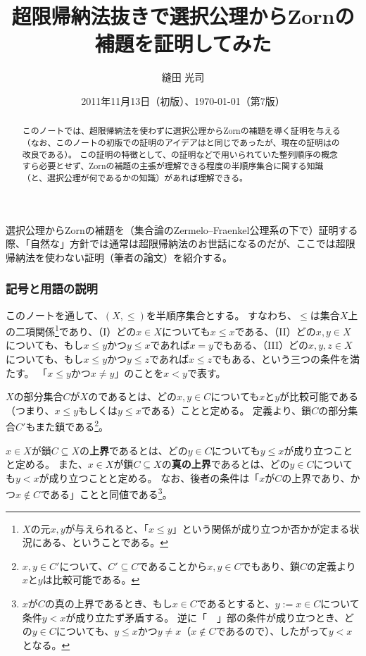﻿\documentclass{ltjsarticle}
\title{超限帰納法抜きで選択公理からZornの補題を証明してみた}
\author{縫田 光司}
\date{2011年11月13日（初版）、\today （第7版）}
\theoremstyle{definition}
\begin{document}
\maketitle
\vspace*{-2em}

\begin{abstract}
    このノートでは、超限帰納法を使わずに選択公理からZornの補題を導く証明を与える（なお、このノートの初版での証明のアイデアは\cite[Theorem 4.19]{RubRub85}と同じであったが、現在の証明は\cite{Lewin91}の改良である）。
    この証明の特徴として、\cite{Lewin91}の証明などで用いられていた整列順序の概念すら必要とせず、Zornの補題の主張が理解できる程度の半順序集合に関する知識（と、選択公理が何であるかの知識）があれば理解できる。
\end{abstract}

選択公理からZornの補題を（集合論のZermelo--Fraenkel公理系の下で）証明する際、「自然な」方針では通常は超限帰納法のお世話になるのだが、ここでは超限帰納法を使わない証明（筆者の論文\cite{Nuida24}）を紹介する。

\subsubsection*{記号と用語の説明}

このノートを通して、$(X,\leq)$を半順序集合とする。
すなわち、$\leq$は集合$X$上の二項関係\footnote{$X$の元$x,y$が与えられると、「$x \leq y$」という関係が成り立つか否かが定まる状況にある、ということである。}であり、（I）どの$x \in X$についても$x \leq x$である、（II）どの$x,y \in X$についても、もし$x \leq y$かつ$y \leq x$であれば$x = y$でもある、（III）どの$x,y,z \in X$についても、もし$x \leq y$かつ$y \leq z$であれば$x \leq z$でもある、という三つの条件を満たす。
「$x \leq y$かつ$x \neq y$」のことを$x < y$で表す。

$X$の部分集合$C$が$X$のであるとは、どの$x,y \in C$についても$x$と$y$が比較可能である（つまり、$x \leq y$もしくは$y \leq x$である）ことと定める。
定義より、鎖$C$の部分集合$C'$もまた鎖である\footnote{$x,y \in C'$について、$C' \subseteq C$であることから$x,y \in C$でもあり、鎖$C$の定義より$x$と$y$は比較可能である。}。

$x \in X$が鎖$C \subseteq X$の\textbf{上界}であるとは、どの$y \in C$についても$y \leq x$が成り立つことと定める。
また、$x \in X$が鎖$C \subseteq X$の\textbf{真の上界}であるとは、どの$y \in C$についても$y < x$が成り立つことと定める。
なお、後者の条件は「$x$が$C$の上界であり、かつ$x \not\in C$である」ことと同値である\footnote{$x$が$C$の真の上界であるとき、もし$x \in C$であるとすると、$y := x \in C$について条件$y < x$が成り立たず矛盾する。
逆に「　」部の条件が成り立つとき、どの$y \in C$についても、$y \leq x$かつ$y \neq x$（$x \not\in C$であるので）、したがって$y < x$となる。}。
\end{document}

